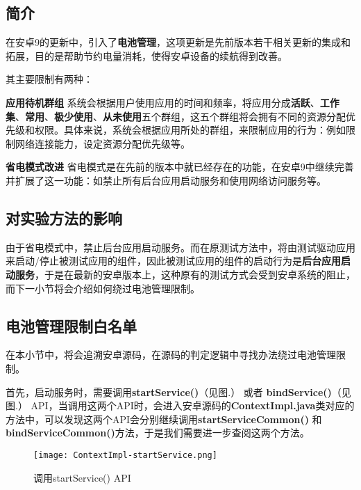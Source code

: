 \subsection{简介}

在安卓9的更新中，引入了\textbf{电池管理}\cite{histroyofpms}，这项更新是先前版本若干相关更新的集成和拓展，目的是帮助节约电量消耗，使得安卓设备的续航得到改善。

其主要限制有两种：

\textbf{应用待机群组} 系统会根据用户使用应用的时间和频率，将应用分成\textbf{活跃}、\textbf{工作集}、\textbf{常用}、\textbf{极少使用}、\textbf{从未使用}五个群组，这五个群组将会拥有不同的资源分配优先级和权限。具体来说，系统会根据应用所处的群组，来限制应用的行为：例如限制网络连接能力，设定资源分配优先级等。
\newline

\textbf{省电模式改进} 省电模式是在先前的版本中就已经存在的功能，在安卓9中继续完善并扩展了这一功能：如禁止所有后台应用启动服务和使用网络访问服务等。

\subsection{对实验方法的影响}

由于省电模式中，禁止后台应用启动服务。而在原测试方法中，将由测试驱动应用来启动/停止被测试应用的组件，因此被测试应用的组件的启动行为是\textbf{后台应用启动服务}，于是在最新的安卓版本上，这种原有的测试方式会受到安卓系统的阻止，而下一小节将会介绍如何绕过电池管理限制。

\subsection{电池管理限制白名单}

在本小节中，将会追溯安卓源码，在源码的判定逻辑中寻找办法绕过电池管理限制。

首先，启动服务时，需要调用\textbf{startService()}（见图.\redbf{\ref{fig:source code:startService}}） 或者 \textbf{bindService()}（见图.\redbf{\ref{fig:source code:bindService}}）  API，当调用这两个API时，会进入安卓源码的\textbf{ContextImpl.java}类对应的方法中，可以发现这两个API会分别继续调用\textbf{startServiceCommon()} 和\textbf{bindServiceCommon()}方法，于是我们需要进一步查阅这两个方法。

\begin{figure}[htbp]
	\centering
	\texttt{[image: ContextImpl-startService.png]} %
	\caption{调用startService() API}
	\label{fig:source code:startService}
\end{figure}

